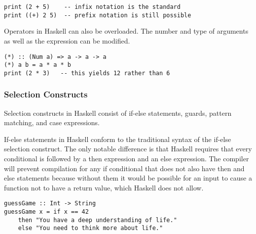 \documentclass[titlepage,12pt]{article}
\begin{document}
\begin{verbatim}
print (2 + 5)    -- infix notation is the standard
print ((+) 2 5)  -- prefix notation is still possible
\end{verbatim}

Operators in Haskell can also be overloaded. The number and type of arguments as well as the expression can be modified. 

\begin{verbatim}
(*) :: (Num a) => a -> a -> a
(*) a b = a * a * b
print (2 * 3)   -- this yields 12 rather than 6
\end{verbatim}

\subsubsection{Selection Constructs}

Selection constructs in Haskell consist of if-else statements, guards, pattern matching, and case expressions. 

If-else statements in Haskell conform to the traditional syntax of the if-else selection construct. The only notable 
difference is that Haskell requires that every conditional is followed by a then expression and an else expression. 
The compiler will prevent compilation for any if conditional that does not also have then and else statements because 
without them it would be possible for an input to cause a function not to have a return value, which Haskell does not allow.

\begin{verbatim}
guessGame :: Int -> String
guessGame x = if x == 42
    then "You have a deep understanding of life."
    else "You need to think more about life."
\end{verbatim}
\end{document}
